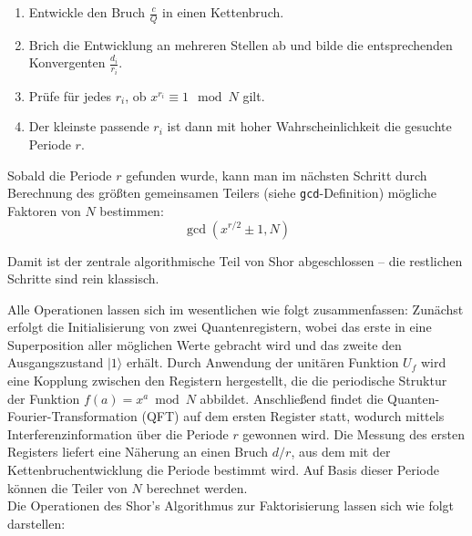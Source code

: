 \begin{enumerate}
\begin{enumerate}
    \item Entwickle den Bruch \( \frac{c}{Q} \) in einen Kettenbruch.
    \item Brich die Entwicklung an mehreren Stellen ab und bilde die entsprechenden Konvergenten \( \frac{d_i}{r_i} \).
    \item Prüfe für jedes \( r_i \), ob \( x^{r_i} \equiv 1 \mod N \) gilt.
    \item Der kleinste passende \( r_i \) ist dann mit hoher Wahrscheinlichkeit die gesuchte Periode \( r \).
\end{enumerate}

\noindent Sobald die Periode \( r \) gefunden wurde, kann man im nächsten Schritt durch Berechnung des größten gemeinsamen Teilers (siehe \texttt{gcd}-Definition) mögliche Faktoren von \( N \) bestimmen:
\[
\gcd(x^{r/2} \pm 1, N)
\]

\noindent Damit ist der zentrale algorithmische Teil von Shor abgeschlossen – die restlichen Schritte sind rein klassisch.\\
\end{enumerate}

\noindent
Alle Operationen lassen sich im wesentlichen wie folgt zusammenfassen: Zunächst erfolgt die Initialisierung von zwei Quantenregistern, wobei das erste in eine Superposition aller möglichen Werte gebracht wird und das zweite den Ausgangszustand \( |1\rangle \) erhält. Durch Anwendung der unitären Funktion \( U_f \) wird eine Kopplung zwischen den Registern hergestellt, die die periodische Struktur der Funktion \( f(a) = x^a \bmod N \) abbildet. Anschließend findet die Quanten-Fourier-Transformation (QFT) auf dem ersten Register statt, wodurch mittels Interferenzinformation über die Periode \( r \) gewonnen wird. Die Messung des ersten Registers liefert eine Näherung an einen Bruch \( d/r \), aus dem mit der Kettenbruchentwicklung die Periode bestimmt wird. Auf Basis dieser Periode können die Teiler von \( N \) berechnet werden. \\

\noindent Die Operationen des Shor's Algorithmus zur Faktorisierung lassen sich wie folgt darstellen:

